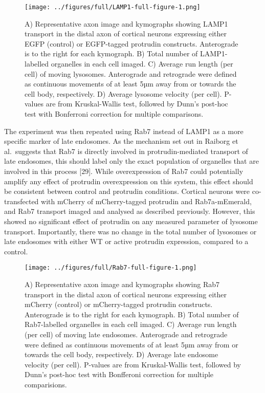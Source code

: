 \documentclass[
  12pt,
  a4paper,
]{book}
\begin{document}
\begin{figure}
\centering
\texttt{[image: ../figures/full/LAMP1-full-figure-1.png]}
\caption{\label{fig:LAMP1-full-figure}A) Representative axon image and kymographs showing LAMP1 transport in the distal axon of cortical neurons expressing either EGFP (control) or EGFP-tagged protrudin constructs. Anterograde is to the right for each kymograph. B) Total number of LAMP1-labelled organelles in each cell imaged. C) Average run length (per cell) of moving lysosomes. Anterograde and retrograde were defined as continuous movements of at least 5µm away from or towards the cell body, respectively. D) Average lysosome velocity (per cell). P-values are from Kruskal-Wallis test, followed by Dunn's post-hoc test with Bonferroni correction for multiple comparisons.}
\end{figure}

The experiment was then repeated using Rab7 instead of LAMP1 as a more specific marker of late endosomes. As the mechanism set out in Raiborg et al.~suggests that Rab7 is directly involved in protrudin-mediated transport of late endosomes, this should label only the exact population of organelles that are involved in this process {[}29{]}. While overexpression of Rab7 could potentially amplify any effect of protrudin overexpression on this system, this effect should be consistent between control and protrudin conditions. Cortical neurons were co-transfected with mCherry of mCherry-tagged protrudin and Rab7a-mEmerald, and Rab7 transport imaged and analysed as described previously. However, this showed no significant effect of protrudin on any measured parameter of lysosome transport. Importantly, there was no change in the total number of lysosomes or late endosomes with either WT or active protrudin expression, compared to a control.

\begin{figure}
\centering
\texttt{[image: ../figures/full/Rab7-full-figure-1.png]}
\caption{\label{fig:Rab7-full-figure}A) Representative axon image and kymographs showing Rab7 transport in the distal axon of cortical neurons expressing either mCherry (control) or mCherry-tagged protrudin constructs. Anterograde is to the right for each kymograph. B) Total number of Rab7-labelled organelles in each cell imaged. C) Average run length (per cell) of moving late endosomes. Anterograde and retrograde were defined as continuous movements of at least 5µm away from or towards the cell body, respectively. D) Average late endosome velocity (per cell). P-values are from Kruskal-Wallis test, followed by Dunn's post-hoc test with Bonfferoni correction for multiple comparisions.}
\end{figure}
\end{document}
